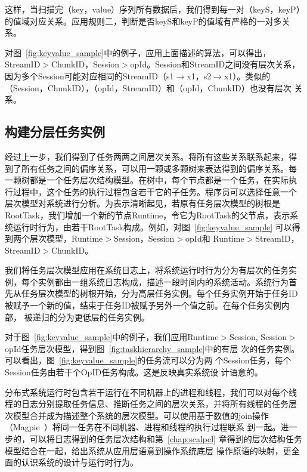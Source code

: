 这样，当扫描完（key，value）序列所有数据后，我们得到每一对（keyS，keyP）
的值域对应关系。应用规则二，判断是否keyS和keyP的值域有严格的一对多关系。

对图~\ref{fig:keyvalue_sample}中的例子，应用上面描述的算法，可以得出，
StreamID$>$ChunkID，Session$>$opId。Session和StreamID之间没有层次关系，
因为多个Session可能对应相同的StreamID（s1$\to$x1，s2$\to$x1）。类似的
（Session，ChunkID），（opId，StreamID）和（opId，ChunkID）也没有层次
关系。

\subsection{构建分层任务实例}

经过上一步，我们得到了任务两两之间层次关系。将所有这些关系联系起来，得
到了所有任务之间的偏序关系，可以用一颗或多颗树来表达得到的偏序关系。每
一颗树都是一个任务层次结构模型。在树中，每个节点都是一个任务，在实际执
行过程中，这个任务的执行过程包含若干它的子任务。程序员可以选择任意一个
层次模型对系统进行分析。为表示清晰起见，若原有任务层次模型的树根是
RootTask，我们增加一个新的节点Runtime，令它为RootTask的父节点，表示系
统运行时行为，由若干RootTask构成。例如，对图~\ref{fig:keyvalue_sample}
可以得到两个层次模型，Runtime$>$Session，Session$>$opId和
Runtime$>$StreamID，StreamID$>$ChunkID。

我们将任务层次模型应用在系统日志上，将系统运行时行为分为有层次的任务实
例，每个实例都由一组系统日志构成，描述一段时间内的系统活动。系统行为首
先从任务层次模型的树根开始，分为高层任务实例。每个任务实例开始于任务ID
被赋予一个新的值，结束于任务ID被赋予另外一个值之前。在每个任务实例内部，
被递归的分为更低层的任务实例。


对于图~\ref{fig:keyvalue_sample}中的例子，我们应用Runtime$>$Session,
Session$>$opId任务层次模型，得到图~\ref{fig:taskhierarchy_sample}中的有层
次的任务实例。可以看出，图~\ref{fig:keyvalue_sample}的任务流可以分为两
个Session任务，每个Session任务由若干个OpID任务构成。这是反映真实系统设
计语意的。

分布式系统运行时包含若干运行在不同机器上的进程和线程，我们可以对每个线
程的日志分别提取任务信息、推断任务之间的层次关系，并将所有线程的任务层
次模型合并成为描述整个系统的层次模型。可以使用基于数值的join操作
（Magpie~\cite{magpie}）将同一任务在不同机器、进程和线程的执行过程联系
到一起。进一步的，可以将日志得到的任务层次结构和第~\ref{chap:scalpel}
章得到的层次结构任务模型结合在一起，给出系统从应用层语意到操作系统底层
操作原语的映射，更全面的认识系统的设计与运行时行为。

